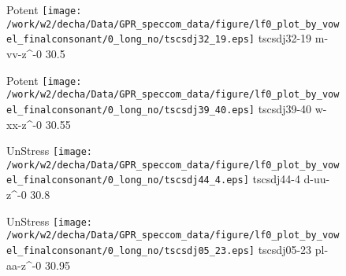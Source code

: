 \documentclass{article}
\begin{document}
\begin{figure}[t]
\begin{minipage}[b]{.24\textwidth}
\colorbox{Apricot}{Potent}
\centering
\texttt{[image: /work/w2/decha/Data/GPR\_speccom\_data/figure/lf0\_plot\_by\_vowel\_finalconsonant/0\_long\_no/tscsdj32\_19.eps]}
tscsdj32-19 m-vv-z\textasciicircum-0 30.5
\end{minipage}
\begin{minipage}[b]{.24\textwidth}
\colorbox{Apricot}{Potent}
\centering
\texttt{[image: /work/w2/decha/Data/GPR\_speccom\_data/figure/lf0\_plot\_by\_vowel\_finalconsonant/0\_long\_no/tscsdj39\_40.eps]}
tscsdj39-40 w-xx-z\textasciicircum-0 30.55
\end{minipage}
\begin{minipage}[b]{.24\textwidth}
UnStress
\centering
\texttt{[image: /work/w2/decha/Data/GPR\_speccom\_data/figure/lf0\_plot\_by\_vowel\_finalconsonant/0\_long\_no/tscsdj44\_4.eps]}
tscsdj44-4 d-uu-z\textasciicircum-0 30.8
\end{minipage}
\begin{minipage}[b]{.24\textwidth}
UnStress
\centering
\texttt{[image: /work/w2/decha/Data/GPR\_speccom\_data/figure/lf0\_plot\_by\_vowel\_finalconsonant/0\_long\_no/tscsdj05\_23.eps]}
tscsdj05-23 pl-aa-z\textasciicircum-0 30.95
\end{minipage}
\end{figure}
\end{document}

